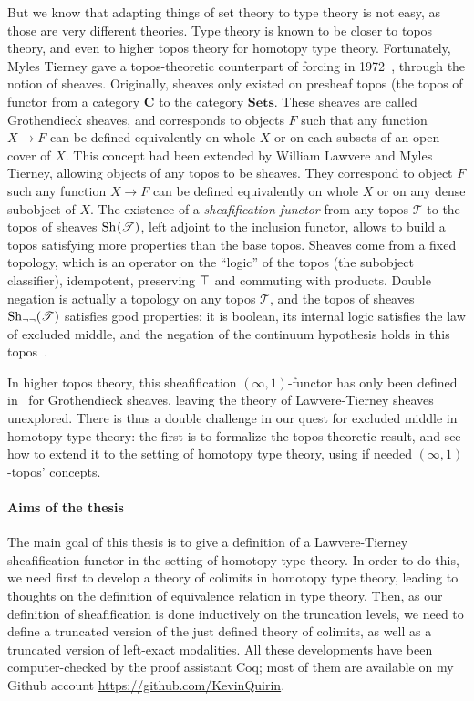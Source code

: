 But we know that adapting things of set theory to type theory is not
easy, as those are very different theories. Type theory is known to be
closer to topos theory, and even to higher topos theory for homotopy
type theory. 
Fortunately, Myles Tierney gave a topos-theoretic counterpart of
forcing in 1972~\cite{tierney1972}, through the notion of
sheaves. Originally, sheaves only existed on presheaf topos (the
topos of functor from a category $\mathbf C$ to the category
$\mathbf{Sets}$. These sheaves are called Grothendieck sheaves, and
corresponds to objects $F$ such that any function $X\to F$ can be
defined equivalently on whole $X$ or on each subsets of an open cover
of $X$.
This concept had been extended by William Lawvere and Myles Tierney,
allowing objects of any topos to be sheaves. They correspond to object
$F$ such any function $X \to F$ can be defined equivalently on whole
$X$ or on any dense subobject of $X$.
The existence of a {\em sheafification functor} from any topos
$\mathcal T$ to the topos of sheaves $\mathrm{Sh}_{}(\mathcal T)$, left adjoint
to the inclusion functor, allows to build a topos satisfying more
properties than the base topos. 
Sheaves come from a fixed topology, which is an operator on the
``logic'' of the topos (the subobject classifier), idempotent,
preserving $\top$ and commuting with products. Double negation is
actually a topology on any topos $\mathcal T$, and the topos of
sheaves $\mathrm{Sh}_{\lnot\lnot}(\mathcal T)$ satisfies good properties: it is
boolean, \ie{} its internal logic satisfies the law of excluded
middle, and the negation of the continuum hypothesis holds in this
topos~\cite{maclanemoerdijk}.

In higher topos theory, this sheafification $(\infty,1)$-functor has
only been defined in~\cite{lurie} for Grothendieck sheaves, leaving
the theory of Lawvere-Tierney sheaves unexplored. There is thus a
double challenge in our quest for excluded middle in homotopy type
theory: the first is to formalize the topos theoretic result, and see
how to extend it to the setting of homotopy type theory, using if
needed $(\infty,1)$-topos' concepts.

\paragraph*{Aims of the thesis} The main goal of this thesis is to
give a definition of a Lawvere-Tierney sheafification functor in the
setting of homotopy type theory. In order to do this, we need first to develop a theory of colimits in homotopy type theory,
leading to thoughts on the definition of equivalence relation in type
theory. Then, as our definition of sheafification is done inductively
on the truncation levels, we need to define a truncated version of the
just defined theory of colimits, as well as a truncated version of
left-exact modalities.  All these developments have been
computer-checked by the proof assistant Coq; most of them are
available on my Github account \url{https://github.com/KevinQuirin}.

